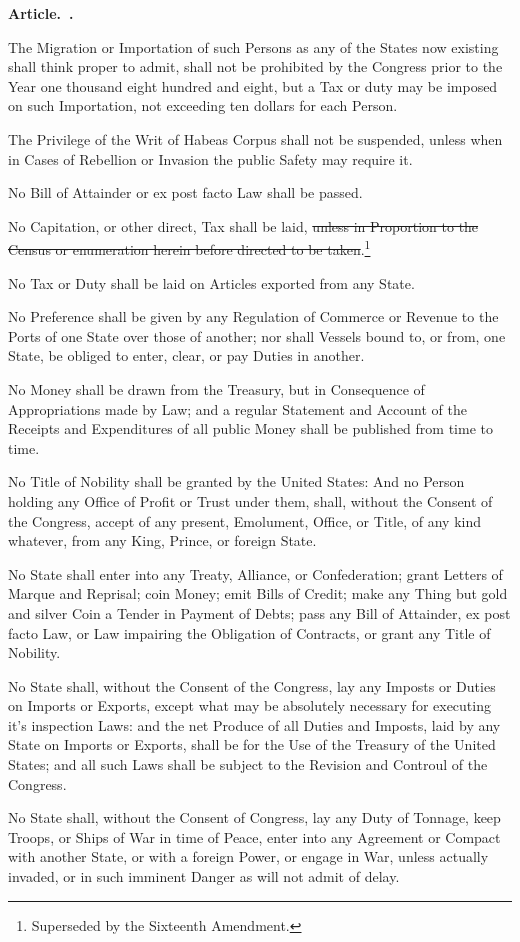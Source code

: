 \documentclass[12pt]{article}
\newcounter{article}
\newenvironment{article}
{\stepcounter{article}\setcounter{sect}{0}\begin{center}
{\bf Article.~\Roman{article}.}
\end{center}}
{}
\newcounter{sect}[article]
\newenvironment{sect}
{\stepcounter{sect}{\bf Section.~\arabic{sect}.}}
{}
\newcommand{\fn}[1]{\footnote{#1}}
\begin{document}
\begin{article}
\begin{sect}
The Migration or Importation of such Persons as any of the States now existing shall think proper to admit, shall not be prohibited by the Congress prior to the Year one thousand eight hundred and eight, but a Tax or duty may be imposed on such Importation, not exceeding ten dollars for each Person.

The Privilege of the Writ of Habeas Corpus shall not be suspended, unless when in Cases of Rebellion or Invasion the public Safety may require it.

No Bill of Attainder or ex post facto Law shall be passed.

No Capitation, or other direct, Tax shall be laid, \st{unless in Proportion to the Census or enumeration herein before directed to be taken}.\fn{Superseded by the Sixteenth Amendment.}

No Tax or Duty shall be laid on Articles exported from any State.

No Preference shall be given by any Regulation of Commerce or Revenue to the Ports of one State over those of another; nor shall Vessels bound to, or from, one State, be obliged to enter, clear, or pay Duties in another.

No Money shall be drawn from the Treasury, but in Consequence of Appropriations made by Law; and a regular Statement and Account of the Receipts and Expenditures of all public Money shall be published from time to time.

No Title of Nobility shall be granted by the United States: And no Person holding any Office of Profit or Trust under them, shall, without the Consent of the Congress, accept of any present, Emolument, Office, or Title, of any kind whatever, from any King, Prince, or foreign State.
\end{sect}

\begin{sect}
No State shall enter into any Treaty, Alliance, or Confederation; grant Letters of Marque and Reprisal; coin Money; emit Bills of Credit; make any Thing but gold and silver Coin a Tender in Payment of Debts; pass any Bill of Attainder, ex post facto Law, or Law impairing the Obligation of Contracts, or grant any Title of Nobility.

No State shall, without the Consent of the Congress, lay any Imposts or Duties on Imports or Exports, except what may be absolutely necessary for executing it's inspection Laws: and the net Produce of all Duties and Imposts, laid by any State on Imports or Exports, shall be for the Use of the Treasury of the United States; and all such Laws shall be subject to the Revision and Controul of the Congress.

No State shall, without the Consent of Congress, lay any Duty of Tonnage, keep Troops, or Ships of War in time of Peace, enter into any Agreement or Compact with another State, or with a foreign Power, or engage in War, unless actually invaded, or in such imminent Danger as will not admit of delay.
\end{sect}

\end{article}
\end{document}
